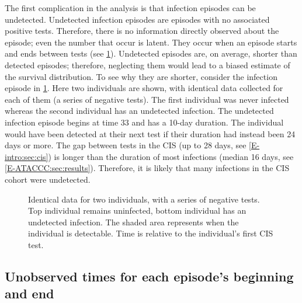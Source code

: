 \documentclass[thesis.tex]{subfiles}
\begin{document}
The first complication in the analysis is that infection episodes can be undetected.
Undetected infection episodes are episodes with no associated positive tests.
Therefore, there is no information directly observed about the episode; even the number that occur is latent.
They occur when an episode starts and ends between tests (see \cref{perf-test:fig:truncation}).
Undetected episodes are, on average, shorter than detected episodes; therefore, neglecting them would lead to a biased estimate of the survival distribution.
To see why they are shorter, consider the infection episode in \cref{perf-test:fig:truncation}.
Here two individuals are shown, with identical data collected for each of them (a series of negative
 tests).
The first individual was never infected whereas the second individual has an undetected infection. 
The undetected infection episode begins at time 33 and has a 10-day duration.
The individual would have been detected at their next test if their duration had instead been 24 days or more.
The gap between tests in the CIS (up to 28 days, see \cref{E-intro:sec:cis}) is longer than the duration of most infections (median 16 days, see \cref{E-ATACCC:sec:results}).
Therefore, it is likely that many infections in the CIS cohort were undetected.
\begin{figure}
  \caption[Undetected episodes in CIS data]{%
    Identical data for two individuals, with a series of negative tests.
    Top individual remains uninfected, bottom individual has an undetected infection.
    The shaded area represents when the individual is detectable.
    Time is relative to the individual's first CIS test.
  }
  \label{perf-test:fig:truncation}
\end{figure}

\subsection{Unobserved times for each episode's beginning and end} \label{perf-test:sec:interval-censoring}
\end{document}
